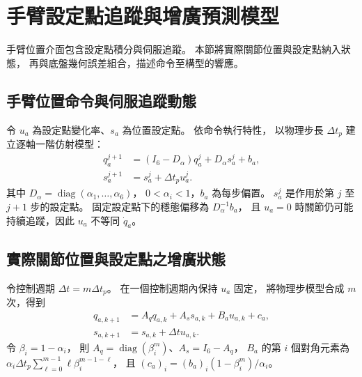 \section{手臂設定點追蹤與增廣預測模型}
\label{sec:arm_augmented_prediction}

手臂位置介面包含設定點積分與伺服追蹤。
本節將實際關節位置與設定點納入狀態，
再與底盤幾何誤差組合，描述命令至構型的響應。

\subsection{手臂位置命令與伺服追蹤動態}
\label{subsec:arm_setpoint_servo}

令 $u_a$ 為設定點變化率、$s_a$ 為位置設定點。
依命令執行特性\cite{grandia2019frequency}，
以物理步長 $\Delta t_p$ 建立逐軸一階仿射模型：
\begin{equation}
    \begin{aligned}
        q_a^{j+1}&=(I_6-D_\alpha)q_a^j+D_\alpha s_a^j+b_a,\\
        s_a^{j+1}&=s_a^j+\Delta t_p u_a^j .
    \end{aligned}
    \label{eq:ch3_physics_step_arm_model}
\end{equation}
其中 $D_\alpha=\operatorname{diag}(\alpha_1,\ldots,\alpha_6)$，
$0<\alpha_i<1$，$b_a$ 為每步偏置。
$s_a^j$ 是作用於第 $j$ 至 $j+1$ 步的設定點。
固定設定點下的穩態偏移為 $D_\alpha^{-1}b_a$，
且 $u_a=0$ 時關節仍可能持續追蹤，因此 $u_a$ 不等同 $\dot q_a$。

\subsection{實際關節位置與設定點之增廣狀態}
\label{subsec:augmented_arm_state}

令控制週期 $\Delta t=m\Delta t_p$。
在一個控制週期內保持 $u_a$ 固定，
將物理步模型合成 $m$ 次，得到
\begin{equation}
    \begin{aligned}
        q_{a,k+1}&=A_q q_{a,k}+A_s s_{a,k}+B_a u_{a,k}+c_a,\\
        s_{a,k+1}&=s_{a,k}+\Delta t u_{a,k}.
    \end{aligned}
    \label{eq:ch3_control_step_arm_model}
\end{equation}
令 $\beta_i=1-\alpha_i$，
則 $A_q=\operatorname{diag}(\beta_i^m)$、$A_s=I_6-A_q$，
$B_a$ 的第 $i$ 個對角元素為
$\alpha_i\Delta t_p\sum_{\ell=0}^{m-1}\ell\beta_i^{m-1-\ell}$，
且 $(c_a)_i=(b_a)_i(1-\beta_i^m)/\alpha_i$。

